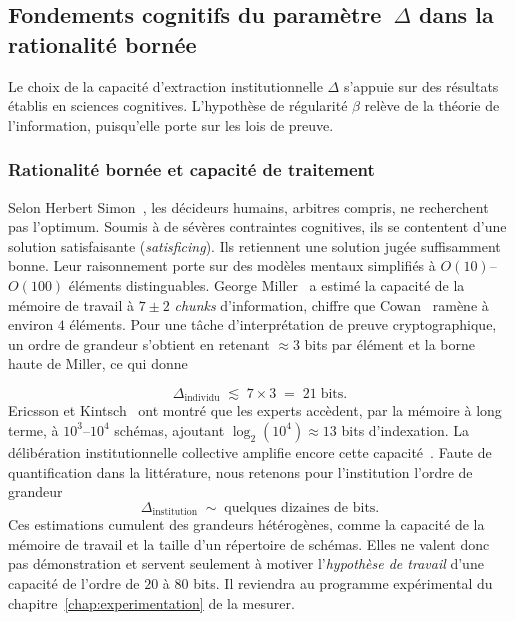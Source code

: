 \subsection{Fondements cognitifs du param\`etre~$\Delta$ dans la rationalit\'e born\'ee}
\label{subsec:fondements_cognitifs}
\begin{sloppypar}
Le choix de la capacit\'e d'extraction institutionnelle $\Delta$ s'appuie sur des r\'esultats
\'etablis en sciences cognitives. L'hypoth\`ese de r\'egularit\'e $\beta$ rel\`eve de la th\'eorie de
l'information, puisqu'elle porte sur les lois de preuve.

\subsubsection{Rationalit\'e born\'ee et capacit\'e de traitement}
\label{subsubsec:rationalite_bornee}

Selon Herbert Simon~\cite{Simon82,Simon1955}, les d\'ecideurs humains, arbitres compris,
ne recherchent pas l'optimum. Soumis \`a de s\'ev\`eres contraintes cognitives, ils se contentent d'une solution satisfaisante (\emph{satisficing}).
Ils retiennent une solution jug\'ee suffisamment bonne. Leur raisonnement porte sur des
mod\`eles mentaux simplifi\'es \`a $O(10)$--$O(100)$ \'el\'ements distinguables. George Miller~\cite{Miller56}
a estim\'e la capacit\'e de la m\'emoire de travail \`a $7 \pm 2$
\emph{chunks} d'information, chiffre que Cowan~\cite{Cowan2001} ram\`ene \`a environ
$4$ \'el\'ements. Pour une t\^ache d'interpr\'etation de preuve cryptographique, un ordre
de grandeur s'obtient en retenant $\approx 3$ bits par \'el\'ement et la borne haute de Miller,
ce qui donne

\begin{equation}
\Delta_{\text{individu}} \;\lesssim\; 7 \times 3 \;=\; 21 \;\text{bits}.
\label{eq:delta_individu}
\end{equation}
Ericsson et Kintsch~\cite{Ericsson95} ont montr\'e que les experts acc\`edent, par
la m\'emoire \`a long terme, \`a $10^3$--$10^4$ sch\'emas, ajoutant
$\log_2(10^4) \approx 13$ bits d'indexation. La d\'elib\'eration institutionnelle
collective amplifie encore cette capacit\'e~\cite{Argyris1978}. Faute de quantification
dans la litt\'erature, nous retenons pour l'institution l'ordre de grandeur
\begin{equation}
\Delta_{\text{institution}} \;\sim\; \text{quelques dizaines de bits}.
\label{eq:delta_institution}
\end{equation}
Ces estimations cumulent des grandeurs h\'et\'erog\`enes, comme la capacit\'e
de la m\'emoire de travail et la taille d'un r\'epertoire de sch\'emas. Elles ne valent
donc pas d\'emonstration et servent seulement \`a motiver l'\emph{hypoth\`ese de travail}
d'une capacit\'e de l'ordre de $20$ \`a $80$ bits. Il reviendra au programme
exp\'erimental du chapitre~\ref{chap:experimentation} de la mesurer.


\end{sloppypar}
